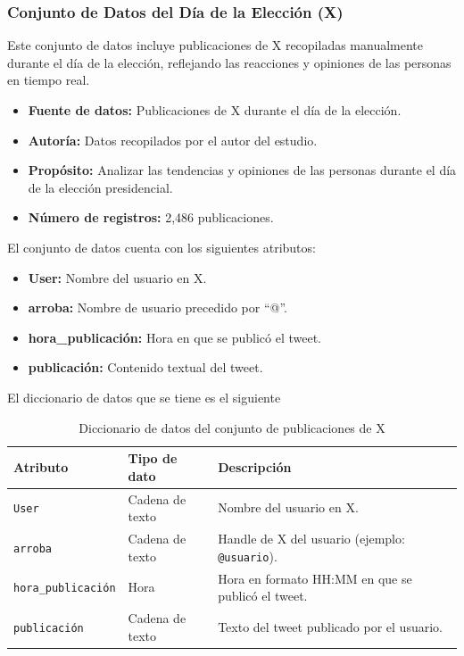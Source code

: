 \documentclass[10pt, a4paper]{article}
\begin{document}
	\subsubsection{Conjunto de Datos del Día de la Elección (X)}
	
	Este conjunto de datos incluye publicaciones de X recopiladas manualmente durante el día de la elección, reflejando las reacciones y opiniones de las personas en tiempo real.
	
	\begin{itemize}
		\item \textbf{Fuente de datos:} Publicaciones de X durante el día de la elección.
		\item \textbf{Autoría:} Datos recopilados por el autor del estudio.
		\item \textbf{Propósito:} Analizar las tendencias y opiniones de las personas durante el día de la elección presidencial.
		\item \textbf{Número de registros:} 2,486 publicaciones.
	\end{itemize}
	
	El conjunto de datos cuenta con los siguientes atributos:
	
	\begin{itemize}
		\item \textbf{User:} Nombre del usuario en X.
		\item \textbf{arroba:} Nombre de usuario precedido por ``@''.
		\item \textbf{hora\_publicación:} Hora en que se publicó el tweet.
		\item \textbf{publicación:} Contenido textual del tweet.
	\end{itemize}
	
	El diccionario de datos que se tiene es el siguiente
	
	\begin{table}[h]
		\centering
		\begin{tabular}{llp{9cm}}
			\hline
			\textbf{Atributo} & \textbf{Tipo de dato} & \textbf{Descripción} \\
			\hline
			\texttt{User} & Cadena de texto & Nombre del usuario en X. \\
			\texttt{arroba} & Cadena de texto & Handle de X del usuario (ejemplo: \texttt{@usuario}). \\
			\texttt{hora\_publicación} & Hora & Hora en formato HH:MM en que se publicó el tweet. \\
			\texttt{publicación} & Cadena de texto & Texto del tweet publicado por el usuario. \\
			\hline
		\end{tabular}
		\caption{Diccionario de datos del conjunto de publicaciones de X}
	\end{table}  
	
\end{document}
